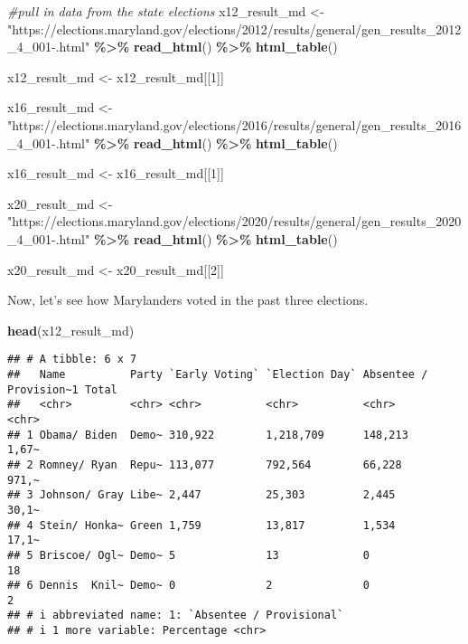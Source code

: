 \documentclass[
]{article}
\newenvironment{Shaded}{\begin{snugshade}}{\end{snugshade}}
\newcommand{\CommentTok}[1]{\textcolor[rgb]{0.56,0.35,0.01}{\textit{#1}}}
\newcommand{\DecValTok}[1]{\textcolor[rgb]{0.00,0.00,0.81}{#1}}
\newcommand{\FunctionTok}[1]{\textcolor[rgb]{0.13,0.29,0.53}{\textbf{#1}}}
\newcommand{\NormalTok}[1]{#1}
\newcommand{\OtherTok}[1]{\textcolor[rgb]{0.56,0.35,0.01}{#1}}
\newcommand{\SpecialCharTok}[1]{\textcolor[rgb]{0.81,0.36,0.00}{\textbf{#1}}}
\newcommand{\StringTok}[1]{\textcolor[rgb]{0.31,0.60,0.02}{#1}}
\begin{document}
\begin{Shaded}
\begin{Highlighting}[]
\CommentTok{\#pull in data from the state elections}
\NormalTok{x12\_result\_md }\OtherTok{\textless{}{-}} \StringTok{"https://elections.maryland.gov/elections/2012/results/general/gen\_results\_2012\_4\_001{-}.html"} \SpecialCharTok{\%\textgreater{}\%}
  \FunctionTok{read\_html}\NormalTok{() }\SpecialCharTok{\%\textgreater{}\%}
  \FunctionTok{html\_table}\NormalTok{()}

\NormalTok{x12\_result\_md }\OtherTok{\textless{}{-}}\NormalTok{ x12\_result\_md[[}\DecValTok{1}\NormalTok{]]}

\NormalTok{x16\_result\_md }\OtherTok{\textless{}{-}} \StringTok{"https://elections.maryland.gov/elections/2016/results/general/gen\_results\_2016\_4\_001{-}.html"} \SpecialCharTok{\%\textgreater{}\%} 
  \FunctionTok{read\_html}\NormalTok{() }\SpecialCharTok{\%\textgreater{}\%} 
  \FunctionTok{html\_table}\NormalTok{()}

\NormalTok{x16\_result\_md }\OtherTok{\textless{}{-}}\NormalTok{ x16\_result\_md[[}\DecValTok{1}\NormalTok{]]}

\NormalTok{x20\_result\_md }\OtherTok{\textless{}{-}} \StringTok{"https://elections.maryland.gov/elections/2020/results/general/gen\_results\_2020\_4\_001{-}.html"} \SpecialCharTok{\%\textgreater{}\%} 
  \FunctionTok{read\_html}\NormalTok{() }\SpecialCharTok{\%\textgreater{}\%} 
  \FunctionTok{html\_table}\NormalTok{()}

\NormalTok{x20\_result\_md }\OtherTok{\textless{}{-}}\NormalTok{ x20\_result\_md[[}\DecValTok{2}\NormalTok{]]}
\end{Highlighting}
\end{Shaded}

Now, let's see how Marylanders voted in the past three elections.

\begin{Shaded}
\begin{Highlighting}[]
\FunctionTok{head}\NormalTok{(x12\_result\_md)}
\end{Highlighting}
\end{Shaded}

\begin{verbatim}
## # A tibble: 6 x 7
##   Name          Party `Early Voting` `Election Day` Absentee / Provision~1 Total
##   <chr>         <chr> <chr>          <chr>          <chr>                  <chr>
## 1 Obama/ Biden  Demo~ 310,922        1,218,709      148,213                1,67~
## 2 Romney/ Ryan  Repu~ 113,077        792,564        66,228                 971,~
## 3 Johnson/ Gray Libe~ 2,447          25,303         2,445                  30,1~
## 4 Stein/ Honka~ Green 1,759          13,817         1,534                  17,1~
## 5 Briscoe/ Ogl~ Demo~ 5              13             0                      18   
## 6 Dennis  Knil~ Demo~ 0              2              0                      2    
## # i abbreviated name: 1: `Absentee / Provisional`
## # i 1 more variable: Percentage <chr>
\end{verbatim}
\end{document}
